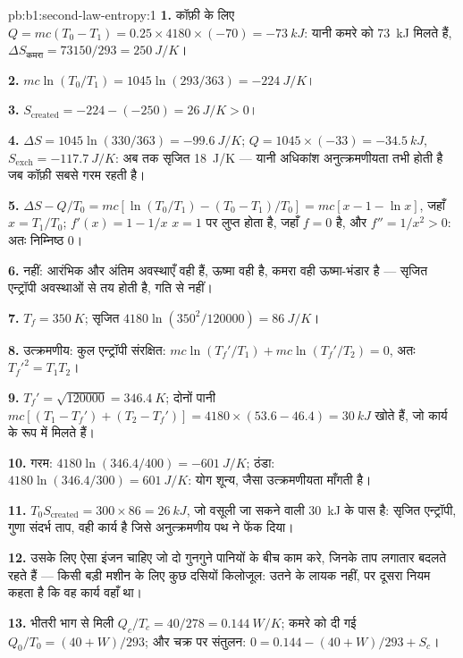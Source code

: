 \begin{solution}{pb:b1:second-law-entropy:1}
\textbf{1.} कॉफ़ी के लिए $Q = mc(T_0 - T_1) = 0.25 \times 4180 \times (-70) = \qty{-73}{kJ}$:
यानी कमरे को \qty{73}{kJ} मिलते हैं, $\Delta S_{\text{कमरा}} = 73150/293
= \qty{+250}{J/K}$।

\textbf{2.} $mc\ln(T_0/T_1) = 1045\ln(293/363) = \qty{-224}{J/K}$।

\textbf{3.} $S_{\mathrm{created}} = -224 - (-250) = \qty{+26}{J/K} > 0$।

\textbf{4.} $\Delta S = 1045\ln(330/363) = \qty{-99.6}{J/K}$; $Q = 1045 \times
(-33) = \qty{-34.5}{kJ}$, $S_{\mathrm{exch}} = \qty{-117.7}{J/K}$: अब तक सृजित
\qty{18}{J/K} --- यानी अधिकांश अनुत्क्रमणीयता तभी होती है जब कॉफ़ी सबसे गरम
रहती है।

\textbf{5.} $\Delta S - Q/T_0 = mc[\ln(T_0/T_1) - (T_0 - T_1)/T_0] = mc[x - 1 -
\ln x]$, जहाँ $x = T_1/T_0$; $f'(x) = 1 - 1/x$ $x = 1$ पर लुप्त होता है, जहाँ
$f = 0$ है, और $f'' = 1/x^2 > 0$: अतः निम्निष्ठ $0$।

\textbf{6.} नहीं: आरंभिक और अंतिम अवस्थाएँ वही हैं, ऊष्मा वही है, कमरा वही
ऊष्मा-भंडार है --- सृजित एन्ट्रॉपी अवस्थाओं से तय होती है, गति से नहीं।

\textbf{7.} $T_f = \qty{350}{K}$; सृजित $4180\ln(350^2/120000) = \qty{86}{J/K}$।

\textbf{8.} उत्क्रमणीय: कुल एन्ट्रॉपी संरक्षित: $mc\ln(T_f'/T_1) + mc\ln(T_f'/
T_2) = 0$, अतः $T_f'^2 = T_1T_2$।

\textbf{9.} $T_f' = \sqrt{120000} = \qty{346.4}{K}$; दोनों पानी $mc[(T_1 -
T_f') + (T_2 - T_f')] = 4180 \times (53.6 - 46.4) = \qty{30}{kJ}$ खोते हैं, जो
कार्य के रूप में मिलते हैं।

\textbf{10.} गरम: $4180\ln(346.4/400) = \qty{-601}{J/K}$; ठंडा: $4180\ln(346.4/
300) = \qty{+601}{J/K}$: योग शून्य, जैसा उत्क्रमणीयता माँगती है।

\textbf{11.} $T_0S_{\mathrm{created}} = 300 \times 86 = \qty{26}{kJ}$, जो वसूली
जा सकने वाली \qty{30}{kJ} के पास है: सृजित एन्ट्रॉपी, गुणा संदर्भ ताप, वही
कार्य है जिसे अनुत्क्रमणीय पथ ने फेंक दिया।

\textbf{12.} उसके लिए ऐसा इंजन चाहिए जो दो गुनगुने पानियों के बीच काम करे,
जिनके ताप लगातार बदलते रहते हैं --- किसी बड़ी मशीन के लिए कुछ दसियों
किलोजूल: उतने के लायक नहीं, पर दूसरा नियम कहता है कि वह कार्य वहाँ था।

\textbf{13.} भीतरी भाग से मिली $Q_c/T_c = 40/278 = \qty{0.144}{W/K}$;
कमरे को दी गई $Q_0/T_0 = (40 + W)/293$; और चक्र पर संतुलन:
$0 = 0.144 - (40 + W)/293 + S_c$।


\end{solution}
